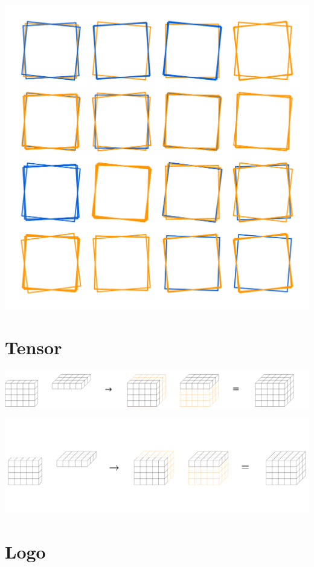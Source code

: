 \documentclass{article}%
\begin{document}
\includegraphics[width=\textwidth]{examples/output/squares.pdf}

\pagebreak
\section{Tensor}

\includegraphics[width=\textwidth]{examples/output/tensor.png}

\includegraphics[width=\textwidth]{examples/output/tensor.pdf}

\pagebreak

\section{Logo}
\end{document}
